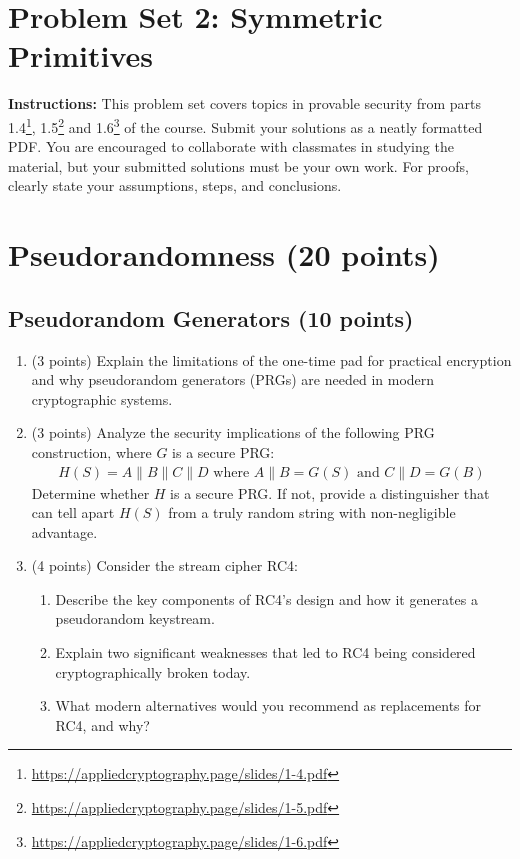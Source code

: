 \documentclass[10pt,a4paper,american]{article}
\begin{document}
\classhandoutheader

\section*{Problem Set 2: Symmetric Primitives}

\begin{tcolorbox}[colframe=OliveGreen!30!white,colback=OliveGreen!5!white]
	\textbf{Instructions:} This problem set covers topics in provable security from parts 1.4\footnote{\url{https://appliedcryptography.page/slides/1-4.pdf}}, 1.5\footnote{\url{https://appliedcryptography.page/slides/1-5.pdf}} and 1.6\footnote{\url{https://appliedcryptography.page/slides/1-6.pdf}} of the course. Submit your solutions as a neatly formatted PDF. You are encouraged to collaborate with classmates in studying the material, but your submitted solutions must be your own work. For proofs, clearly state your assumptions, steps, and conclusions.
\end{tcolorbox}

\section{Pseudorandomness (20 points)}

\subsection{Pseudorandom Generators (10 points)}

\begin{enumerate}
	\item (3 points) Explain the limitations of the one-time pad for practical encryption and why pseudorandom generators (PRGs) are needed in modern cryptographic systems.

	\item (3 points) Analyze the security implications of the following PRG construction, where $G$ is a secure PRG:
	      \begin{align*}
		      H(S) = A \| B \| C \| D \text{ where } A \| B = G(S) \text{ and } C \| D = G(B)
	      \end{align*}
	      Determine whether $H$ is a secure PRG. If not, provide a distinguisher that can tell apart $H(S)$ from a truly random string with non-negligible advantage.

	\item (4 points) Consider the stream cipher RC4:
	      \begin{enumerate}
		      \item Describe the key components of RC4's design and how it generates a pseudorandom keystream.
		      \item Explain two significant weaknesses that led to RC4 being considered cryptographically broken today.
		      \item What modern alternatives would you recommend as replacements for RC4, and why?
	      \end{enumerate}
\end{enumerate}
\end{document}
